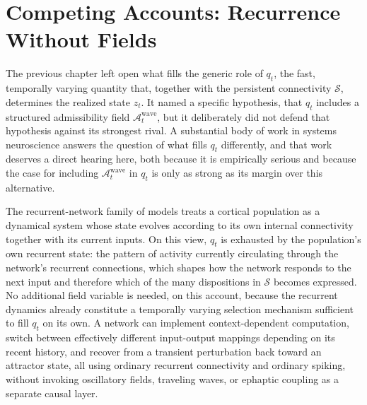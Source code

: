 \documentclass[11pt]{book}
\begin{document}
\chapter{Competing Accounts: Recurrence Without Fields}

The previous chapter left open what fills the generic role of $q_t$, the fast, temporally varying quantity that, together with the persistent connectivity $\mathcal S$, determines the realized state $z_t$. It named a specific hypothesis, that $q_t$ includes a structured admissibility field $\mathcal A_t^{\mathrm{wave}}$, but it deliberately did not defend that hypothesis against its strongest rival. A substantial body of work in systems neuroscience answers the question of what fills $q_t$ differently, and that work deserves a direct hearing here, both because it is empirically serious and because the case for including $\mathcal A_t^{\mathrm{wave}}$ in $q_t$ is only as strong as its margin over this alternative.

The recurrent-network family of models treats a cortical population as a dynamical system whose state evolves according to its own internal connectivity together with its current inputs. On this view, $q_t$ is exhausted by the population's own recurrent state: the pattern of activity currently circulating through the network's recurrent connections, which shapes how the network responds to the next input and therefore which of the many dispositions in $\mathcal S$ becomes expressed. No additional field variable is needed, on this account, because the recurrent dynamics already constitute a temporally varying selection mechanism sufficient to fill $q_t$ on its own. A network can implement context-dependent computation, switch between effectively different input-output mappings depending on its recent history, and recover from a transient perturbation back toward an attractor state, all using ordinary recurrent connectivity and ordinary spiking, without invoking oscillatory fields, traveling waves, or ephaptic coupling as a separate causal layer.
\end{document}
